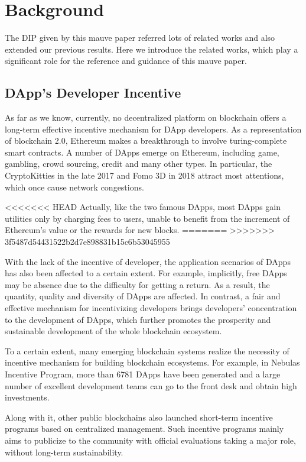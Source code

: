 \section{Background}
\label{sec:background}
The DIP given by this mauve paper referred  lots of related works and also extended our previous results. Here we introduce the related works, which play a significant role for the  reference and guidance of this mauve paper.

\subsection{DApp's Developer Incentive}
As far as we know, currently, no decentralized platform on blockchain offers a long-term effective incentive mechanism for DApp developers. As a representation of blockchain 2.0, Ethereum makes a breakthrough to involve turing-complete smart contracts. A number of DApps emerge on Ethereum, including game, gambling, crowd sourcing, credit and many other types. In particular, the CryptoKitties in the late 2017 and Fomo 3D in 2018 attract most attentions, which once cause network congestions.

<<<<<<< HEAD
Actually, like the two famous DApps, most DApps gain utilities only by charging fees to users, unable to benefit from the increment of Ethereum's value or the rewards for new blocks. 
=======
>>>>>>> 3f5487d54431522b2d7e898831b15c6b53045955

With the lack of the incentive of developer, the application scenarios of DApps
has also been affected to a certain extent. For example, implicitly, free DApps
may be absence due to the difficulty for getting a return. As a result, the
quantity, quality and diversity of DApps are affected. In contrast, a fair and
effective mechanism for incentivizing developers brings developers'
concentration to the development of DApps, which further promotes the prosperity and sustainable development of the whole blockchain ecosystem.

To a certain extent, many emerging blockchain systems realize the necessity of incentive mechanism for building blockchain ecosystems. For example, in Nebulas Incentive Program, more than 6781 DApps have been generated and a large number of excellent development teams can go to the front desk and obtain high investments.

Along with it, other public blockchains also launched short-term incentive programs based on centralized management. Such incentive programs mainly aims to publicize to the community with official evaluations taking a major role, without long-term sustainability.


